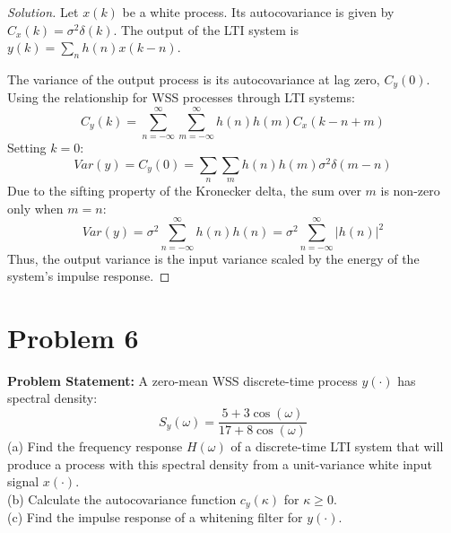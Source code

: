 \documentclass{article}
\begin{document}
\begin{proof}[Solution]
	Let $x(k)$ be a white process. Its autocovariance is given by $C_x(k) = \sigma^2 \delta(k)$. The output of the LTI system is $y(k) = \sum_{n} h(n)x(k-n)$.
	
	The variance of the output process is its autocovariance at lag zero, $C_y(0)$. Using the relationship for WSS processes through LTI systems:
	\[ C_y(k) = \sum_{n=-\infty}^{\infty} \sum_{m=-\infty}^{\infty} h(n) h(m) C_x(k-n+m) \]
	Setting $k=0$:
	\[ Var(y) = C_y(0) = \sum_{n} \sum_{m} h(n) h(m) \sigma^2 \delta(m-n) \]
	Due to the sifting property of the Kronecker delta, the sum over $m$ is non-zero only when $m=n$:
	\[ Var(y) = \sigma^2 \sum_{n=-\infty}^{\infty} h(n) h(n) = \sigma^2 \sum_{n=-\infty}^{\infty} |h(n)|^2 \]
	Thus, the output variance is the input variance scaled by the energy of the system's impulse response.
\end{proof}


\section*{Problem 6}
\textbf{Problem Statement:}
A zero-mean WSS discrete-time process $y(\cdot)$ has spectral density:
\[ S_y(\omega) = \frac{5 + 3 \cos(\omega)}{17 + 8 \cos(\omega)} \]
(a) Find the frequency response $H(\omega)$ of a discrete-time LTI system that will produce a process with this spectral density from a unit-variance white input signal $x(\cdot)$.\\
(b) Calculate the autocovariance function $c_y(\kappa)$ for $\kappa \ge 0$.\\
(c) Find the impulse response of a whitening filter for $y(\cdot)$.
\end{document}
